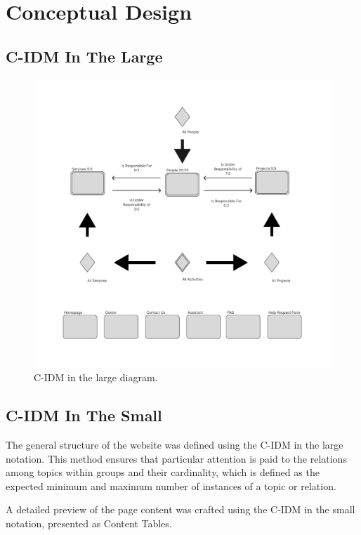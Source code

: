 \section{Conceptual Design}

\subsection{C-IDM In The Large}

\begin{figure}[h]
	\centering
	\includegraphics[width=\linewidth]{Resources/CIDM_in_large.png}
	\caption{C-IDM in the large diagram.}
	\label{fig:example}
\end{figure}


\subsection{C-IDM In The Small}
The general structure of the website was defined using the C-IDM in the large notation. 
This method ensures that particular attention is paid to the relations among topics within groups and their cardinality, 
which is defined as the expected minimum and maximum number of instances of a topic or relation.


A detailed preview of the page content was crafted using the C-IDM in the small notation, presented as Content Tables.

